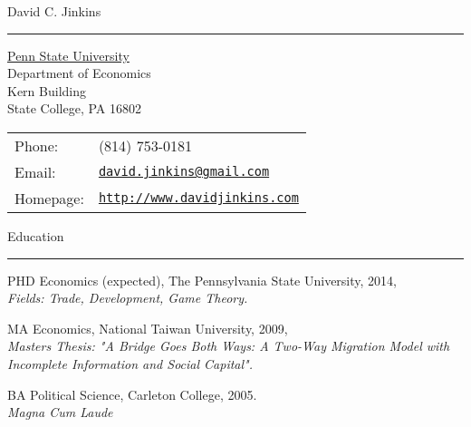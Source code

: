 \documentclass[letterpaper]{article}
\def\name{David C. Jinkins}
\renewenvironment{itemize}{
    \begin{list}{}{
            \setlength{\leftmargin}{1.5em}
            \setlength{\parskip}{0pt}
            \setlength{\parsep}{0pt}
        }
    }{
    \end{list}
}
\begin{document}
{\huge \name}
\hrule


\vspace{4mm}

\begin{minipage}{0.45\linewidth}
    \hspace*{5mm}\href{http://www.psu.edu/}{Penn State University} \\
    \hspace*{5mm}Department of Economics \\
    \hspace*{5mm}Kern Building \\
    \hspace*{5mm}State College, PA 16802
\end{minipage}
\begin{minipage}{0.45\linewidth}
    \begin{tabular}{ll}
        Phone: & (814) 753-0181 \\
        Email: & \href{mailto:david.jinkins@gmail.com}{\tt david.jinkins@gmail.com} \\
        Homepage: & \href{http://www.davidjinkins.com}{\tt http://www.davidjinkins.com} \\
    \end{tabular}
\end{minipage}

\vspace{7mm}
{\Large Education}
\vspace{1mm}
\hrule

\begin{itemize}
    \item PHD Economics (expected), The Pennsylvania State University, 2014,\\
        \hspace*{1cm}\emph{Fields: Trade, Development, Game Theory.}

    \item MA Economics, National Taiwan University, 2009,\\
        \hspace*{1cm}\emph{Masters Thesis: "A Bridge Goes Both Ways: A Two-Way Migration Model with Incomplete Information \hspace*{1cm}and Social Capital".}

    \item BA Political Science, Carleton College, 2005.\\
        \hspace*{1cm}\emph{Magna Cum Laude}
\end{itemize}
\end{document}

